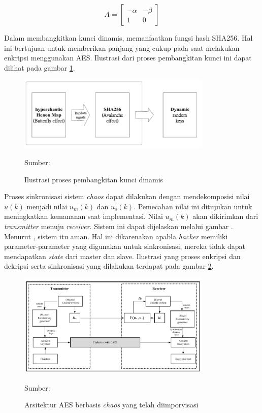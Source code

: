 \begin{equation}
\label{eq:lin.henon.a-matrix}
A = \begin{bmatrix}
  -\alpha & -\beta \\
  1 & 0 
  \end{bmatrix}
\end{equation}

Dalam membangkitkan kunci dinamis, \textcite{lin2021} memanfaatkan fungsi hash SHA256. Hal ini bertujuan untuk memberikan panjang yang cukup pada saat melakukan enkripsi menggunakan AES. Ilustrasi dari proses pembangkitan kunci ini dapat dilihat pada gambar \ref{fig:lin.keygen}.

\begin{figure}[!h]
  \centering
  \includegraphics[width=350px]{chapters/res/chapter-2/img/lin.keygen.png}
  \caption{Ilustrasi proses pembangkitan kunci dinamis} \label{fig:lin.keygen}
  Sumber: \textcite{lin2021}
\end{figure}

Proses sinkronisasi sistem \emph{chaos} dapat dilakukan dengan mendekomposisi nilai $u(k)$ menjadi nilai $u_m(k)$ dan $u_s(k)$. Pemecahan nilai ini ditujukan untuk meningkatkan kemananan saat implementasi. Nilai $u_m(k)$ akan dikirimkan dari \emph{transmitter} menuju \emph{receiver}. Sistem ini dapat dijelaskan melalui gambar . Menurut \textcite{lin2021}, sistem itu aman. Hal ini dikarenakan apabla \emph{hacker} memiliki parameter-parameter yang digunakan untuk sinkronisasi, mereka tidak dapat mendapatkan \emph{state} dari master dan slave. Ilustrasi yang proses enkripsi dan dekripsi serta sinkronisasi yang dilakukan terdapat pada gambar \ref{fig:lin.caes}.

\begin{figure}[!h]
  \centering
  \includegraphics[width=350px]{chapters/res/chapter-2/img/lin.caes.png}
  \caption{Arsitektur AES berbasis \emph{chaos} yang telah diimporvisasi} \label{fig:lin.caes}
  Sumber: \textcite{lin2021}
\end{figure}

